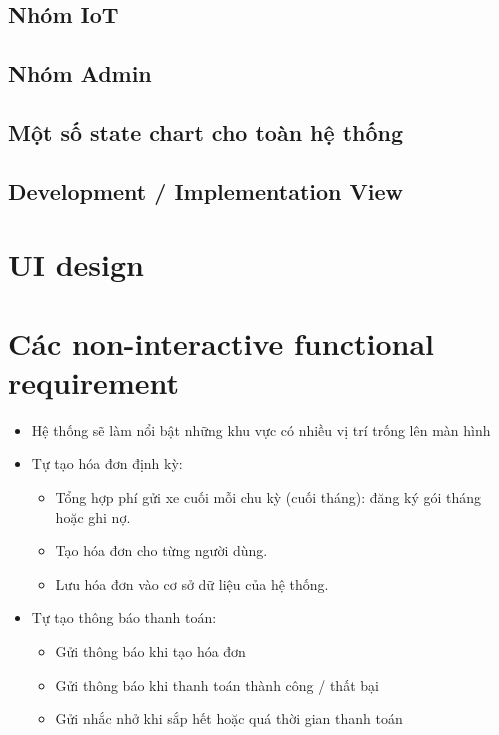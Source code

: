 \documentclass[a4paper,12pt]{article}
\begin{document}
\subsection{Nhóm IoT}


\subsection{Nhóm Admin}


\subsection{Một số state chart cho toàn hệ thống}


\subsection{Development / Implementation View}

\section{UI design}


\section{Các non-interactive functional requirement}
\begin{itemize}
    \item Hệ thống sẽ làm nổi bật những khu vực có nhiều vị trí trống lên màn hình
\end{itemize} 

\begin{itemize}
    \item Tự tạo hóa đơn định kỳ:
    \vspace*{-5pt}
    \begin{itemize}
        \item Tổng hợp phí gửi xe cuối mỗi chu kỳ (cuối tháng): đăng ký gói tháng hoặc ghi nợ.
        \item Tạo hóa đơn cho từng người dùng.
        \item Lưu hóa đơn vào cơ sở dữ liệu của hệ thống.

    \end{itemize}
\end{itemize}
\begin{itemize}
    \item Tự tạo thông báo thanh toán:
    \vspace*{-5pt}
    \begin{itemize}
        \item Gửi thông báo khi tạo hóa đơn
        \item Gửi thông báo khi thanh toán thành công / thất bại
        \item Gửi nhắc nhở khi sắp hết hoặc quá thời gian thanh toán
    \end{itemize}
\end{itemize}
\end{document}
